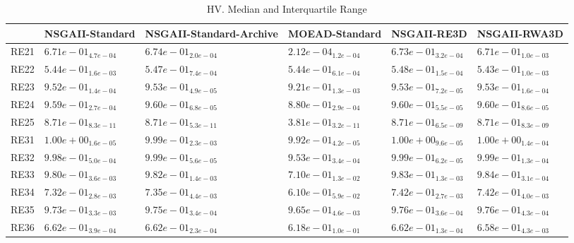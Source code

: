 \documentclass{article}
\begin{document}
\begin{table}
\caption{HV. Median and Interquartile Range}
\label{table: HV}
\centering
\begin{scriptsize}
\begin{tabular}{llllll}
\hline & NSGAII-Standard & NSGAII-Standard-Archive & MOEAD-Standard & NSGAII-RE3D &  NSGAII-RWA3D\\
\hline 
RE21 & $  6.71e-01_{ 4.7e-04}$ & \cellcolor{gray95}$  6.74e-01_{ 2.0e-04}$ & $  2.12e-04_{ 1.2e-04}$ & \cellcolor{gray25}$  6.73e-01_{ 3.2e-04}$ & $  6.71e-01_{ 1.0e-03}$ \\
RE22 & $  5.44e-01_{ 1.6e-03}$ & \cellcolor{gray25}$  5.47e-01_{ 7.4e-04}$ & $  5.44e-01_{ 6.1e-04}$ & \cellcolor{gray95}$  5.48e-01_{ 1.5e-04}$ & $  5.43e-01_{ 1.0e-03}$ \\
RE23 & $  9.52e-01_{ 1.4e-04}$ & \cellcolor{gray25}$  9.53e-01_{ 4.9e-05}$ & $  9.21e-01_{ 1.3e-03}$ & \cellcolor{gray95}$  9.53e-01_{ 7.2e-05}$ & $  9.53e-01_{ 1.6e-04}$ \\
RE24 & $  9.59e-01_{ 2.7e-04}$ & \cellcolor{gray25}$  9.60e-01_{ 6.8e-05}$ & $  8.80e-01_{ 2.9e-04}$ & \cellcolor{gray95}$  9.60e-01_{ 5.5e-05}$ & $  9.60e-01_{ 8.6e-05}$ \\
RE25 & \cellcolor{gray25}$  8.71e-01_{ 8.3e-11}$ & \cellcolor{gray95}$  8.71e-01_{ 5.3e-11}$ & $  3.81e-01_{ 3.2e-11}$ & $  8.71e-01_{ 6.5e-09}$ & $  8.71e-01_{ 8.3e-09}$ \\
RE31 & \cellcolor{gray95}$  1.00e+00_{ 1.6e-05}$ & $  9.99e-01_{ 2.3e-03}$ & $  9.92e-01_{ 4.2e-05}$ & $  1.00e+00_{ 9.6e-05}$ & \cellcolor{gray25}$  1.00e+00_{ 1.4e-04}$ \\
RE32 & $  9.98e-01_{ 5.0e-04}$ & \cellcolor{gray95}$  9.99e-01_{ 5.6e-05}$ & $  9.53e-01_{ 3.4e-04}$ & \cellcolor{gray25}$  9.99e-01_{ 6.2e-05}$ & $  9.99e-01_{ 1.3e-04}$ \\
RE33 & $  9.80e-01_{ 3.6e-03}$ & $  9.82e-01_{ 1.4e-03}$ & $  7.10e-01_{ 1.3e-02}$ & \cellcolor{gray25}$  9.83e-01_{ 1.3e-03}$ & \cellcolor{gray95}$  9.84e-01_{ 3.1e-04}$ \\
RE34 & $  7.32e-01_{ 2.8e-03}$ & $  7.35e-01_{ 4.4e-03}$ & $  6.10e-01_{ 5.9e-02}$ & \cellcolor{gray95}$  7.42e-01_{ 2.7e-03}$ & \cellcolor{gray25}$  7.42e-01_{ 4.0e-03}$ \\
RE35 & $  9.73e-01_{ 3.3e-03}$ & $  9.75e-01_{ 3.4e-04}$ & $  9.65e-01_{ 4.6e-03}$ & \cellcolor{gray95}$  9.76e-01_{ 3.6e-04}$ & \cellcolor{gray25}$  9.76e-01_{ 4.3e-04}$ \\
RE36 & \cellcolor{gray95}$  6.62e-01_{ 3.9e-04}$ & \cellcolor{gray25}$  6.62e-01_{ 2.3e-04}$ & $  6.18e-01_{ 1.0e-01}$ & $  6.62e-01_{ 1.3e-04}$ & $  6.58e-01_{ 4.3e-03}$ \\

\end{tabular}
\end{scriptsize}
\end{table}
\end{document}
